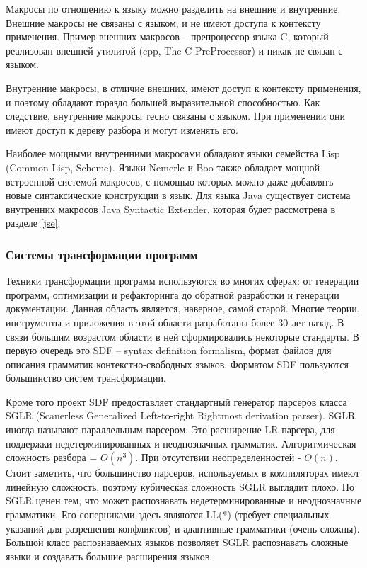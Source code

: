 \documentclass[a4paper,12pt,titlepage]{extarticle}
\begin{document}
Макросы по отношению к языку можно разделить на внешние и внутренние.
Внешние макросы не связаны с языком, и не имеют доступа к контексту применения.
Пример внешних макросов -- препроцессор языка C, который реализован внешней
утилитой (cpp, The C PreProcessor) и никак не связан с языком.

Внутренние макросы, в отличие внешних, имеют доступ к контексту применения, и
поэтому обладают гораздо большей выразительной способностью. Как следствие,
внутренние макросы тесно связаны с языком. При применении они имеют доступ к
дереву разбора и могут изменять его.

Наиболее мощными внутренними макросами обладают языки семейства Lisp
(Common Lisp, Scheme). Языки Nemerle и Boo также обладает мощной встроенной
системой макросов, с помощью которых можно даже добавлять новые синтаксические
конструкции в язык. Для языка Java существует система внутренних макросов Java
Syntactic Extender, которая будет рассмотрена в разделе \ref{jse}.

\subsubsection*{Системы трансформации программ}
Техники трансформации программ используются во многих сферах: от генерации
программ, оптимизации и рефакторинга до обратной разработки и генерации
документации.
Данная область является, наверное, самой старой. Многие теории, инструменты и
приложения в этой области разработаны более 30 лет назад.
В связи большим возрастом области в ней сформировались некоторые стандарты.
В первую очередь это SDF \cite{sdf} -- syntax definition formalism, формат
файлов для описания грамматик контекстно-свободных языков. Форматом SDF пользуются
большинство систем трансформации.

Кроме того проект SDF предоставляет стандартный генератор парсеров класса SGLR
(Scanerless Generalized Left-to-right Rightmost derivation parser). SGLR иногда
называют параллельным парсером. Это расширение LR парсера, для поддержки
недетерминированных и неоднозначных грамматик. Алгоритмическая сложность разбора
= $O(n^3)$. При отсутствии неопределенностей - $O(n)$. Стоит заметить, что
большинство парсеров, используемых в компиляторах имеют линейную сложность,
поэтому кубическая сложность SGLR выглядит плохо. Но SGLR ценен тем, что может
распознавать недетерминированные и неоднозначные грамматики. Его соперниками
здесь являются LL(*) (требует специальных указаний для разрешения конфликтов) и
адаптивные грамматики (очень сложны). Большой класс распознаваемых языков
позволяет SGLR распознавать сложные языки и создавать большие расширения языков.
\end{document}
